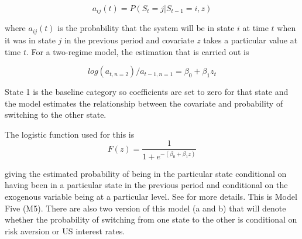 \documentclass[12pt, a4paper, oneside]{article}\usepackage[]{graphicx}\usepackage[]{color}
\begin{document}
\begin{equation}
a_{ij}(t) = P(S_t = j|S_{t-1} = i, z)
\end{equation}

where $a_{ij}(t)$ is the probability that the system will be in state $i$ at time $t$ when it was in state $j$ in the previous period and  covariate $z$ takes a particular value at time $t$.  For a two-regime model, the  estimation that is carried out is 

\begin{equation}
log(a_{t,n = 2})/ a_{t-1, n = 1} = \beta_{0} +\beta_1 z_t 
\end{equation}

State 1 is the baseline category so coefficients are set to zero for that state and the model estimates the relationship between the covariate and probability of switching to the other state. 

The logistic function used for this is 
\begin{equation} 
F(z)  = \frac{1}{1 + e^{-(\beta_0 + \beta_1 z)}}
\label{eqref:zcov}
\end{equation}
 
giving the estimated probability of being in the particular state conditional on having been in a particular state in the previous period and conditional on the exogenous variable being at a particular level.  See \citet[pp.174-75]{agresti2014categorical} for more details.  This is Model Five (M5). There are also two version of this model (a and b) that will denote whether the probability of switching from one state to the other is conditional on risk aversion or US interest rates. 
\end{document}
